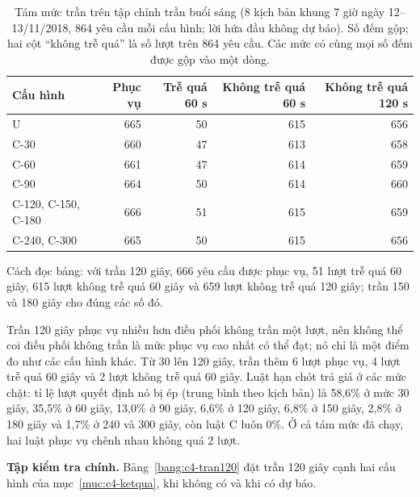 \begin{table}[htbp]
\centering
\caption{Tám mức trần trên tập chỉnh trần buổi sáng (8 kịch bản khung 7 giờ ngày 12--13/11/2018, 864 yêu cầu
mỗi cấu hình; lời hứa đầu không dự báo). Số đếm gộp; hai cột ``không trễ quá'' là số lượt trên 864 yêu cầu. Các mức
có cùng mọi số đếm được gộp vào một dòng.}
\label{bang:c4-sang}
\small
\begin{tabular}{@{}lrrrr@{}}
\toprule
\textbf{Cấu hình} & \textbf{Phục vụ} & \textbf{Trễ quá 60 s} & \textbf{Không trễ quá 60 s} &
\textbf{Không trễ quá 120 s}\\
\midrule
U & 665 & 50 & 615 & 656\\
C-30 & 660 & 47 & 613 & 658\\
C-60 & 661 & 47 & 614 & 659\\
C-90 & 664 & 50 & 614 & 660\\
C-120, C-150, C-180 & 666 & 51 & 615 & 659\\
C-240, C-300 & 665 & 50 & 615 & 656\\
\bottomrule
\end{tabular}
\end{table}

Cách đọc bảng: với trần 120 giây, 666 yêu cầu được phục vụ, 51 lượt trễ quá 60 giây, 615 lượt không trễ quá 60 giây
và 659 lượt không trễ quá 120 giây; trần 150 và 180 giây cho đúng các số đó.

Trần 120 giây phục vụ nhiều hơn điều phối không trần một lượt, nên không thể coi điều phối không trần là mức phục vụ
cao nhất có thể đạt; nó chỉ là một điểm đo như các cấu hình khác. Từ 30 lên 120 giây, trần thêm 6 lượt phục vụ, 4
lượt trễ quá 60 giây và 2 lượt không trễ quá 60 giây. Luật hạn chót trả giá ở các mức chặt: tỉ lệ lượt quyết định nó
bị ép (trung bình theo kịch bản) là 58,6\% ở mức 30 giây, 35,5\% ở 60 giây, 13,0\% ở 90 giây, 6,6\% ở 120 giây,
6,8\% ở 150 giây, 2,8\% ở 180 giây và 1,7\% ở 240 và 300 giây, còn luật C luôn 0\%. Ở cả tám mức đã chạy, hai luật
phục vụ chênh nhau không quá 2 lượt.

\textbf{Tập kiểm tra chính.} Bảng~\ref{bang:c4-tran120} đặt trần 120 giây cạnh hai cấu hình của
mục~\ref{muc:c4-ketqua}, khi không có và khi có dự báo.

